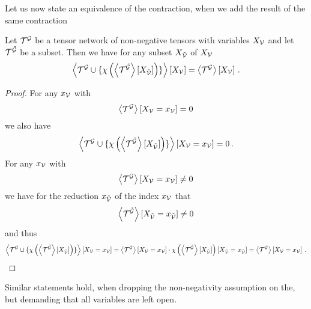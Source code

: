 Let us now state an equivalence of the contraction, when we add the result of the same contraction 
\begin{theorem}\label{the:invarianceAddingSubcontractions}
	Let $\mathcal{T}^{\mathcal{G}}$ be a tensor network of non-negative tensors with variables $X_{\mathcal{V}}$ and let $\mathcal{T}^{\tilde{\mathcal{G}}}$ be a subset.
	Then we have for any subset $X_{\tilde{\mathcal{V}}}$ of $X_{\mathcal{V}}$
		\[ \left\langle \mathcal{T}^{\mathcal{G}} \cup\{
			\chi\left(
			\left\langle \mathcal{T}^{\tilde{\mathcal{G}}}\right\rangle \left[ X_{\tilde{\mathcal{V}}} \right]
			\right)
		\}\right\rangle \left[ X_{\mathcal{V}} \right] 
		= \left\langle \mathcal{T}^{\mathcal{G}}\right\rangle \left[ X_{\mathcal{V}} \right]
		\, . \]
	
\end{theorem}
\begin{proof}
	For any $x_{\mathcal{V}}$ with 
		\[ \left\langle \mathcal{T}^{\mathcal{G}}\right\rangle \left[ X_{\mathcal{V}}=x_{\mathcal{V}} \right] = 0 \]
	we also have 
		\[ \left\langle \mathcal{T}^{\mathcal{G}} \cup\{
			\chi\left(
			\left\langle \mathcal{T}^{\tilde{\mathcal{G}}}\right\rangle \left[ X_{\tilde{\mathcal{V}}} \right]
			\right)
		\}\right\rangle \left[ X_{\mathcal{V}}=x_{\mathcal{V}} \right] = 0 \, . \]
	For any $x_{\mathcal{V}}$ with 
		\[ \left\langle \mathcal{T}^{\mathcal{G}}\right\rangle \left[ X_{\mathcal{V}}=x_{\mathcal{V}} \right] \neq 0 \]
	we have for the reduction $x_{\tilde{\mathcal{V}}}$ of the index $x_{\mathcal{V}}$ that
		\[  \left\langle \mathcal{T}^{\tilde{\mathcal{G}}}\right\rangle \left[ X_{\tilde{\mathcal{V}}}=x_{\tilde{\mathcal{V}}} \right] \neq 0 \]
	and thus
	\begin{align*}
		\left\langle \mathcal{T}^{\mathcal{G}} \cup\{
			\chi\left(
			\left\langle \mathcal{T}^{\tilde{\mathcal{G}}}\right\rangle \left[ X_{\tilde{\mathcal{V}}} \right]
			\right)
		\}\right\rangle \left[ X_{\mathcal{V}}=x_{\mathcal{V}} \right] 
		= \left\langle \mathcal{T}^{\mathcal{G}}\right\rangle \left[ X_{\mathcal{V}}=x_{\mathcal{V}} \right] \cdot \chi\left(
			\left\langle \mathcal{T}^{\tilde{\mathcal{G}}}\right\rangle \left[ X_{\tilde{\mathcal{V}}} \right]
			\right)[X_{\tilde{\mathcal{V}}}=x_{\tilde{\mathcal{V}}}]
		= \left\langle \mathcal{T}^{\mathcal{G}}\right\rangle \left[ X_{\mathcal{V}}=x_{\mathcal{V}} \right] \, . 
	\end{align*}
\end{proof}





\begin{remark}
	Similar statements hold, when dropping the non-negativity assumption on the, but demanding that all variables are left open.
\end{remark}




















